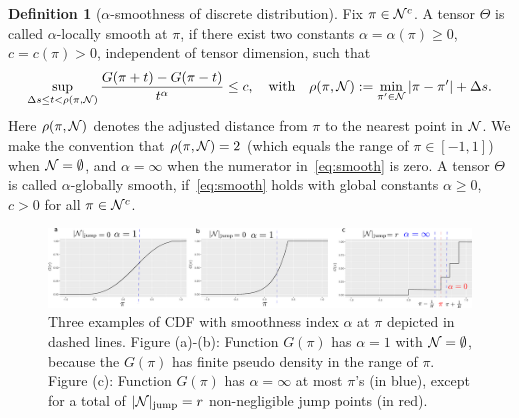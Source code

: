 \documentclass[twoside,11pt]{article}
\theoremstyle{definition}
\newtheorem{defn}{Definition}
\begin{document}
\begin{defn}[$\alpha$-smoothness of discrete distribution]\label{ass:margin} Fix $\pi \in \mathcal{N}^c$. A tensor $\Theta$ is called $\alpha$-locally smooth at $\pi$, if there exist two constants $\alpha=\alpha(\pi)\geq 0$, $c=c(\pi)>0$, independent of tensor dimension, such that
\begin{equation}\label{eq:smooth}
\sup_{\Delta s \leq t<\rho(\pi, \mathcal{N})}{G(\pi+{t})-G(\pi-{t})\over t^\alpha} \leq c, \quad \text{with}\quad \rho(\pi,\mathcal{N}):=\min_{\pi'\in \mathcal{N}}|\pi-\pi'|+\Delta s.
\end{equation}
Here $\rho(\pi,\mathcal{N})$ denotes the adjusted distance from $\pi$ to the nearest point in $\mathcal{N}$. We make the convention that $\rho(\pi,\mathcal{N}) = 2$ (which equals the range of $\pi\in[-1,1]$) when $\mathcal{N} = \emptyset$, and $\alpha=\infty$ when the numerator in~\eqref{eq:smooth} is zero. %
A tensor $\Theta$ is called $\alpha$-globally smooth, if~\eqref{eq:smooth} holds with global constants $\alpha\geq 0$, $c>0$ for all $\pi\in \mathcal{N}^c$. 
\end{defn}

\begin{figure}
    \centering
    \includegraphics[width = \textwidth]{figure/cdf_new.pdf}
    \caption{Three examples of CDF with smoothness index $\alpha$ at $\pi$ depicted in dashed lines. Figure (a)-(b): Function $G(\pi)$ has $\alpha = 1$ with $\mathcal{N} = \emptyset$, because the $G(\pi)$ has finite pseudo density in the range of $\pi$. Figure (c): Function $G(\pi)$ has $\alpha = \infty$ at most $\pi$'s (in blue), except for a total of $|\mathcal{N}|_{\text{jump}}=r$ non-negligible jump points (in red).}
    \label{fig:cdf}
\end{figure}
\end{document}

